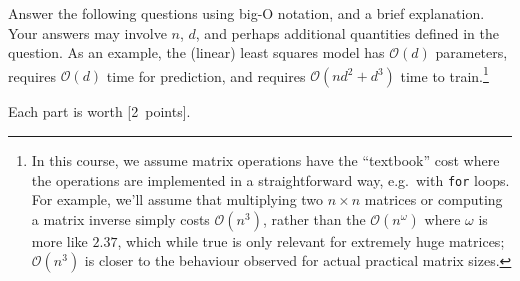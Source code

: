 \documentclass{article}
\newcommand{\pts}[1]{\textcolor{points}{[#1~points]}}
\newcommand{\bigO}{\mathcal{O}}
\begin{document}
Answer the following questions using big-O notation, and a brief explanation.
Your answers may involve $n$, $d$, and perhaps additional quantities defined in the question. 
As an example, the (linear) least squares model has $\bigO(d)$ parameters, requires $\bigO(d)$ time for prediction, and requires $\bigO(nd^2 + d^3)$ time to train.\footnote{In this course, we assume matrix operations have the ``textbook'' cost where the operations are implemented in a straightforward way, e.g.\ with \texttt{for} loops. For example, we'll assume that multiplying two $n \times n$ matrices or computing a matrix inverse simply costs $\bigO(n^3)$, rather than the $\bigO(n^\omega)$ where $\omega$ is more like $2.37$, which while true is only relevant for extremely huge matrices; $\bigO(n^3)$ is closer to the behaviour observed for actual practical matrix sizes.}

Each part is worth \pts{2}.
\end{document}
